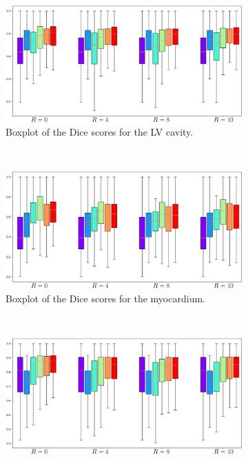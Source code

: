 \begin{figure}[H]
	\centering
	\graphicspath{{images/}{\main/images/}}
	\begin{subfigure}{0.83\textwidth}
    		\includegraphics[width=\textwidth]{Boxplot_DiceScores_LV-Cavity.pdf}
    		\caption{Boxplot of the Dice scores for the LV cavity.} %
    		\label{fig:Boxplot_DiceScores_LV-Cavity}
	\end{subfigure}
	\\
	\begin{subfigure}{0.83\textwidth}
    		\includegraphics[width=\textwidth]{Boxplot_DiceScores_Myocardium.pdf}
    		\caption{Boxplot of the Dice scores for the myocardium.} %
    		\label{fig:Boxplot_DiceScores_Myocardium}
	\end{subfigure}
	\\
	\begin{subfigure}{0.83\textwidth}
    		\includegraphics[width=\textwidth]{Boxplot_DiceScores_RV-Cavity.pdf}

\end{subfigure}
\end{figure}
